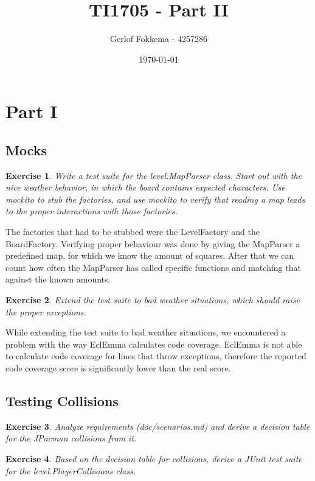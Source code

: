 \documentclass[a4paper]{article}
\title{TI1705 - Part II}
\author{Gerlof Fokkema - 4257286}
\date{\today}
\newtheorem{thm}{Exercise}
\begin{document}
  \maketitle
  \section{Part I}
  
  \subsection{Mocks}
    \begin{thm}
      Write a test suite for the level.MapParser class. Start out with the nice
      weather behavior, in which the board contains expected characters. Use mockito
      to stub the factories, and use mockito to verify that reading a map leads to the
      proper interactions with those factories.
    \end{thm}
    The factories that had to be stubbed were the LevelFactory and the BoardFactory.
    Verifying proper behaviour was done by giving the MapParser a predefined map, for which we know the amount of squares.
    After that we can count how often the MapParser has called specific functions and matching that against the known amounts.

    \begin{thm}
      Extend the test suite to bad weather situations,
      which should raise the proper exceptions.
    \end{thm}
    While extending the test suite to bad weather situations, we encountered a problem with the way EclEmma calculates code coverage.
    EclEmma is not able to calculate code coverage for lines that throw exceptions, therefore the reported code coverage score is significantly lower than the real score.
    
  \subsection{Testing Collisions}
    \begin{thm}
      Analyze requirements (doc/scenarios.md) and derive a decision table for the
      JPacman collisions from it.
    \end{thm}

    \begin{thm}
      Based on the decision table for collisions, derive a JUnit test suite for the
      level.PlayerCollisions class.
    \end{thm}
\end{document}
